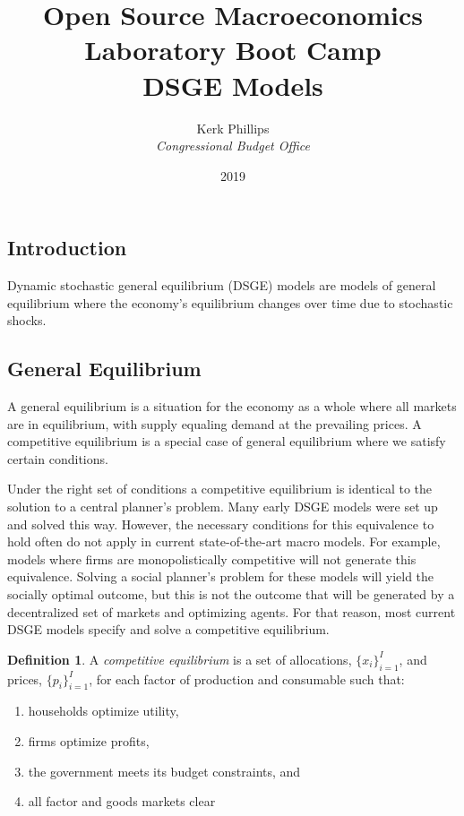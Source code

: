 \documentclass[letterpaper,12pt]{article}
\theoremstyle{definition}
\newtheorem{definition}{Definition} %
\begin{document}
\begin{titlepage}
	\title{Open Source Macroeconomics Laboratory Boot Camp \\ DSGE Models}  %
	\author{Kerk Phillips\\ \emph{Congressional Budget Office}}
	\date{\LARGE{2019}}
	\maketitle
\end{titlepage}

\begin{spacing}{1.5}

\section{Introduction}
	Dynamic stochastic general equilibrium (DSGE) models are models of general equilibrium where the economy's equilibrium changes over time due to stochastic shocks.

	\subsection{General Equilibrium}
		A general equilibrium is a situation for the economy as a whole where all markets are in equilibrium, with supply equaling demand at the prevailing prices. A competitive equilibrium is a special case of general equilibrium where we satisfy certain conditions.

		Under the right set of conditions a competitive equilibrium is identical to the solution to a central planner's problem. Many early DSGE models were set up and solved this way. However, the necessary conditions for this equivalence to hold often do not apply in current state-of-the-art macro models. For example, models where firms are monopolistically competitive will not generate this equivalence. Solving a social planner's problem for these models will yield the socially optimal outcome, but this is not the outcome that will be generated by a decentralized set of markets and optimizing agents. For that reason, most current DSGE models specify and solve a competitive equilibrium.

		\begin{definition}
		A \emph{competitive equilibrium} is a set of allocations, $\{x_i\}_{i=1}^I$, and prices, $\{p_i\}_{i=1}^I$, for each factor of production and consumable such that:
		   \begin{enumerate}
		      \item households optimize utility,
		      \item firms optimize profits,
		      \item the government meets its budget constraints, and
		      \item all factor and goods markets clear
		   \end{enumerate}
		\end{definition}


\end{spacing}
\end{document}
